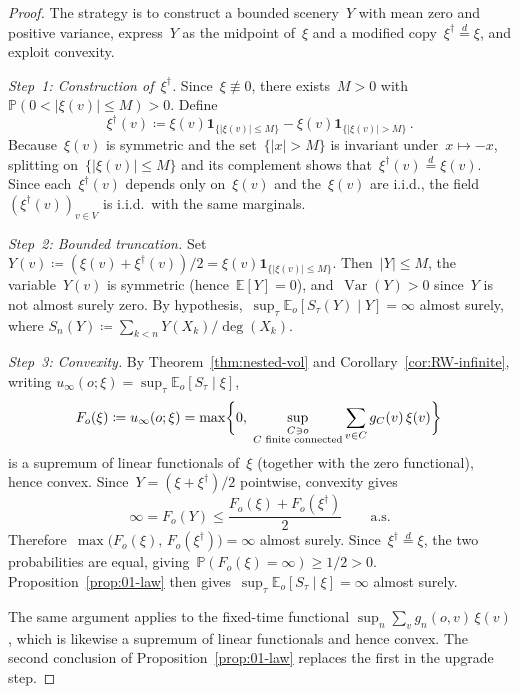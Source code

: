 \documentclass[11pt]{amsart}
\theoremstyle{plain}
\theoremstyle{definition}
\newcommand{\E}{\mathbb{E}}
\renewcommand{\P}{\mathbb{P}}
\newcommand{\one}{\mathbf{1}}
\DeclareMathOperator{\var}{Var}
\begin{document}
	\begin{proof}
		The strategy is to construct a bounded scenery~$Y$ with mean zero and positive variance, express~$Y$ as the midpoint of~$\xi$ and a modified copy~$\xi^\dagger\stackrel{d}{=}\xi$, and exploit convexity.
		
		\medskip
		\emph{Step~1: Construction of~$\xi^\dagger$.}\;
		Since~$\xi\not\equiv 0$, there exists~$M>0$ with~$\P(0<|\xi(v)|\leq M)>0$.  Define
		\[
		\xi^\dagger(v)\coloneqq \xi(v)\one_{\{|\xi(v)|\leq M\}}-\xi(v)\one_{\{|\xi(v)|>M\}}\,.
		\]
		Because~$\xi(v)$ is symmetric and the set~$\{|x|>M\}$ is invariant under~$x\mapsto -x$, splitting on~$\{|\xi(v)|\leq M\}$ and its complement shows that~$\xi^\dagger(v)\stackrel{d}{=}\xi(v)$.  Since each~$\xi^\dagger(v)$ depends only on~$\xi(v)$ and the~$\xi(v)$ are i.i.d., the field~$(\xi^\dagger(v))_{v\in V}$ is i.i.d.\ with the same marginals.
		
		\medskip
		\emph{Step~2: Bounded truncation.}\;
		Set~$Y(v)\coloneqq(\xi(v)+\xi^\dagger(v))/2=\xi(v)\one_{\{|\xi(v)|\leq M\}}$.  Then~$|Y|\leq M$, the variable~$Y(v)$ is symmetric (hence~$\E[Y]=0$), and~$\var(Y)>0$ since~$Y$ is not almost surely zero.  By hypothesis,~$\sup_\tau\E_o[S_\tau(Y)\mid Y]=\infty$ almost surely, where $S_n(Y)\coloneqq\sum_{k<n}Y(X_k)/\deg(X_k)$.
		
		\medskip
		\emph{Step~3: Convexity.}\;
		By Theorem~\ref{thm:nested-vol} and Corollary~\ref{cor:RW-infinite}, writing $u_\infty(o;\xi)=\sup_\tau\E_o[S_\tau\mid\xi]$,
		\[
		F_o(\xi)\coloneqq u_\infty(o;\xi)=\max\biggl\{0,\;\sup_{\substack{C\ni o\\ C\textup{ finite connected}}}\sum_{v\in C}g_C(v)\,\xi(v)\biggr\}\,
		\]
		is a supremum of linear functionals of~$\xi$ (together with the zero functional), hence convex.
		Since~$Y=(\xi+\xi^\dagger)/2$ pointwise, convexity gives
		\[
		\infty=F_o(Y)\leq\frac{F_o(\xi)+F_o(\xi^\dagger)}{2}\qquad\text{a.s.}
		\]
		Therefore~$\max\bigl(F_o(\xi),\,F_o(\xi^\dagger)\bigr)=\infty$ almost surely.  Since~$\xi^\dagger\stackrel{d}{=}\xi$, the two probabilities are equal, giving~$\P(F_o(\xi)=\infty)\geq 1/2>0$.  Proposition~\ref{prop:01-law} then gives~$\sup_\tau\E_o[S_\tau\mid\xi]=\infty$ almost surely.
		
		The same argument applies to the fixed-time functional $\sup_n\sum_v g_n(o,v)\,\xi(v)$, which is likewise a supremum of linear functionals and hence convex.  The second conclusion of Proposition~\ref{prop:01-law} replaces the first in the upgrade step.
	\end{proof}
	
\end{document}
